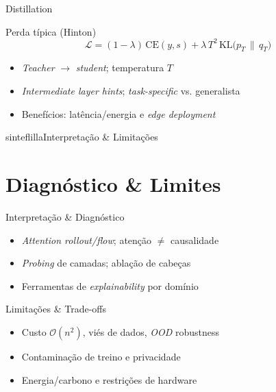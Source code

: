 \documentclass{beamer}
\begin{document}
\begin{frame}{Distillation}
	\begin{block}{Perda típica (Hinton)}
		\small
		\[
			\mathcal{L}=(1-\lambda)\,\mathrm{CE}(y,s)+\lambda\,T^2\,\mathrm{KL}\!\big(p_T \,\|\, q_T\big)
		\]
	\end{block}
	\begin{itemize}[<+->]
		\item \textit{Teacher} $\rightarrow$ \textit{student}; temperatura $T$
		\item \textit{Intermediate layer hints}; \textit{task-specific} vs. generalista
		\item Benefícios: latência/energia e \textit{edge deployment}
	\end{itemize}
\end{frame}

\begin{chapter}{sinteflilla}{Interpretação \& Limitações}\end{chapter}

\section{Diagnóstico \& Limites}
\begin{frame}{Interpretação \& Diagnóstico}
	\begin{itemize}[<+->]
		\item \textit{Attention rollout/flow}; atenção $\neq$ causalidade
		\item \textit{Probing} de camadas; ablação de cabeças
		\item Ferramentas de \textit{explainability} por domínio
	\end{itemize}
\end{frame}

\begin{frame}{Limitações \& Trade-offs}
	\begin{itemize}[<+->]
		\item Custo $\mathcal{O}(n^2)$, viés de dados, \textit{OOD} robustness
		\item Contaminação de treino e privacidade
		\item Energia/carbono e restrições de hardware
	\end{itemize}
\end{frame}

\end{document}
